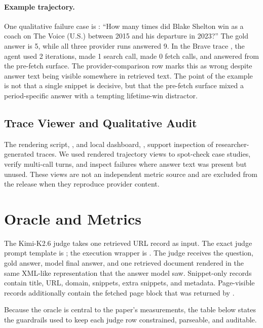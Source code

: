 \paragraph{Example trajectory.}
One qualitative failure case is : ``How many times did Blake Shelton win as a coach on The Voice (U.S.) between 2015 and his departure in 2023?'' The gold answer is 5, while all three provider runs answered 9. In the Brave trace , the agent used 2 iterations, made 1 search call, made 0 fetch calls, and answered from the pre-fetch surface. The provider-comparison row marks this as wrong despite answer text being visible somewhere in retrieved text. The point of the example is not that a single snippet is decisive, but that the pre-fetch surface mixed a period-specific answer with a tempting lifetime-win distractor.

\subsection{Trace Viewer and Qualitative Audit}
\label{app:trace-viewer}
The rendering script, , and local dashboard, , support inspection of researcher-generated traces. We used rendered trajectory views to spot-check case studies, verify multi-call turns, and inspect failures where answer text was present but unused. These views are not an independent metric source and are excluded from the release when they reproduce provider content.

\section{Oracle and Metrics}
\label{app:metrics}
\label{app:judge-schema}
The Kimi-K2.6 judge takes one retrieved URL record as input. The exact judge prompt template is ; the execution wrapper is . The judge receives the question, gold answer, model final answer, and one retrieved document rendered in the same XML-like representation that the answer model saw. Snippet-only records contain title, URL, domain, snippets, extra snippets, and metadata. Page-visible records additionally contain the fetched page block that was returned by \fetchPage{}.

Because the oracle is central to the paper's measurements, the table below states the guardrails used to keep each judge row constrained, parseable, and auditable.

